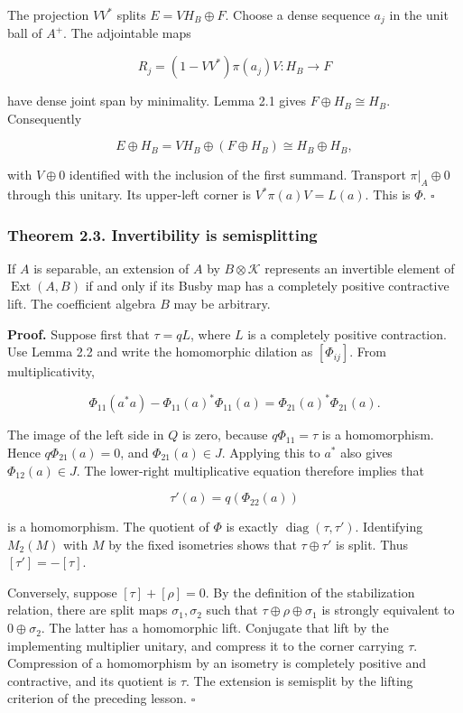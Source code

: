 \documentclass[
  11pt,
]{article}
\begin{document}
The projection \(VV^*\) splits \(E=VH_B\oplus F\). Choose a dense
sequence \(a_j\) in the unit ball of \(A^+\). The adjointable maps

\[
R_j=(1-VV^*)\pi(a_j)V:H_B\longrightarrow F
\]

have dense joint span by minimality. Lemma 2.1 gives
\(F\oplus H_B\cong H_B\). Consequently

\[
E\oplus H_B
=VH_B\oplus(F\oplus H_B)
\cong H_B\oplus H_B,
\]

with \(V\oplus0\) identified with the inclusion of the first summand.
Transport \(\pi|_A\oplus0\) through this unitary. Its upper-left corner
is \(V^*\pi(a)V=L(a)\). This is \(\Phi\). \(\square\)

\subsubsection{Theorem 2.3. Invertibility is
semisplitting}\label{theorem-2.3.-invertibility-is-semisplitting}

If \(A\) is separable, an extension of \(A\) by \(B\otimes\mathcal K\)
represents an invertible element of \(\operatorname{Ext}(A,B)\) if and
only if its Busby map has a completely positive contractive lift. The
coefficient algebra \(B\) may be arbitrary.

\textbf{Proof.} Suppose first that \(\tau=qL\), where \(L\) is a
completely positive contraction. Use Lemma 2.2 and write the homomorphic
dilation as \([\Phi_{ij}]\). From multiplicativity,

\[
\Phi_{11}(a^*a)-\Phi_{11}(a)^*\Phi_{11}(a)
=\Phi_{21}(a)^*\Phi_{21}(a).
\]

The image of the left side in \(Q\) is zero, because \(q\Phi_{11}=\tau\)
is a homomorphism. Hence \(q\Phi_{21}(a)=0\), and \(\Phi_{21}(a)\in J\).
Applying this to \(a^*\) also gives \(\Phi_{12}(a)\in J\). The
lower-right multiplicative equation therefore implies that

\[
\tau'(a)=q(\Phi_{22}(a))
\]

is a homomorphism. The quotient of \(\Phi\) is exactly
\(\operatorname{diag}(\tau,\tau')\). Identifying \(M_2(M)\) with \(M\)
by the fixed isometries shows that \(\tau\oplus\tau'\) is split. Thus
\([\tau']=-[\tau]\).

Conversely, suppose \([\tau]+[\rho]=0\). By the definition of the
stabilization relation, there are split maps \(\sigma_1,\sigma_2\) such
that \(\tau\oplus\rho\oplus\sigma_1\) is strongly equivalent to
\(0\oplus\sigma_2\). The latter has a homomorphic lift. Conjugate that
lift by the implementing multiplier unitary, and compress it to the
corner carrying \(\tau\). Compression of a homomorphism by an isometry
is completely positive and contractive, and its quotient is \(\tau\).
The extension is semisplit by the lifting criterion of the preceding
lesson. \(\square\)
\end{document}
